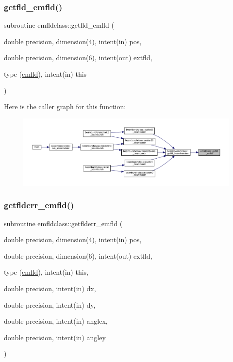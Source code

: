 \subsubsection{\texorpdfstring{getfld\_emfld()}{getfld\_emfld()}}
{\footnotesize\ttfamily subroutine emfldclass\+::getfld\+\_\+emfld (\begin{DoxyParamCaption}\item[{double precision, dimension(4), intent(in)}]{pos,  }\item[{double precision, dimension(6), intent(out)}]{extfld,  }\item[{type (\mbox{\hyperlink{namespaceemfldclass_structemfldclass_1_1emfld}{emfld}}), intent(in)}]{this }\end{DoxyParamCaption})}

Here is the caller graph for this function\+:\nopagebreak
\begin{figure}[H]
\begin{center}
\leavevmode
\includegraphics[width=350pt]{namespaceemfldclass_aa0023b4b2c7a17c75becc20eeb9be23c_icgraph}
\end{center}
\end{figure}
\mbox{\label{namespaceemfldclass_ad7628b9fdaf5e839e55f71c3f8678c11}} 
\subsubsection{\texorpdfstring{getflderr\_emfld()}{getflderr\_emfld()}}
{\footnotesize\ttfamily subroutine emfldclass\+::getflderr\+\_\+emfld (\begin{DoxyParamCaption}\item[{double precision, dimension(4), intent(in)}]{pos,  }\item[{double precision, dimension(6), intent(out)}]{extfld,  }\item[{type (\mbox{\hyperlink{namespaceemfldclass_structemfldclass_1_1emfld}{emfld}}), intent(in)}]{this,  }\item[{double precision, intent(in)}]{dx,  }\item[{double precision, intent(in)}]{dy,  }\item[{double precision, intent(in)}]{anglex,  }\item[{double precision, intent(in)}]{angley }\end{DoxyParamCaption})}

